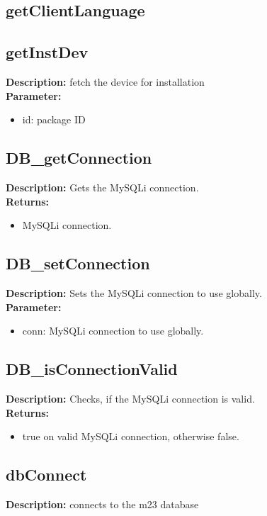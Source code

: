 \subsection{getClientLanguage}

\subsection{getInstDev}
\textbf{Description:} fetch the device for installation\\
\textbf{Parameter:}
\begin{itemize}
\item id: package ID
\end{itemize}

\subsection{DB\_getConnection}
\textbf{Description:} Gets the MySQLi connection.\\
\textbf{Returns:}
\begin{itemize}
\item MySQLi connection.
\end{itemize}

\subsection{DB\_setConnection}
\textbf{Description:} Sets the MySQLi connection to use globally.\\
\textbf{Parameter:}
\begin{itemize}
\item conn: MySQLi connection to use globally.
\end{itemize}

\subsection{DB\_isConnectionValid}
\textbf{Description:} Checks, if the MySQLi connection is valid.\\
\textbf{Returns:}
\begin{itemize}
\item true on valid MySQLi connection, otherwise false.
\end{itemize}

\subsection{dbConnect}
\textbf{Description:} connects to the m23 database\\

